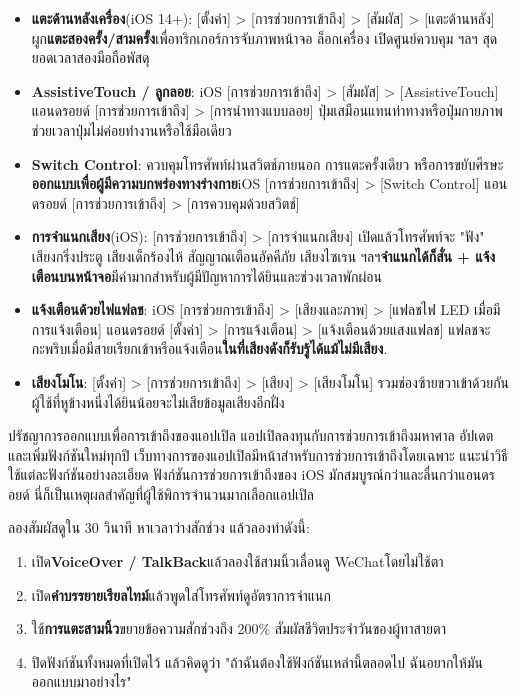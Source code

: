 \begin{itemize}
  \item \textbf{แตะด้านหลังเครื่อง}(iOS 14+): [ตั้งค่า] > [การช่วยการเข้าถึง] > [สัมผัส] > [แตะด้านหลัง] ผูก\textbf{แตะสองครั้ง/สามครั้ง}เพื่อทริกเกอร์การจับภาพหน้าจอ ล็อกเครื่อง เปิดศูนย์ควบคุม ฯลฯ สุดยอดเวลาสองมือถือพัสดุ
  \item \textbf{AssistiveTouch / ลูกลอย}: iOS [การช่วยการเข้าถึง] > [สัมผัส] > [AssistiveTouch] แอนดรอยด์ [การช่วยการเข้าถึง] > [การนำทางแบบลอย] ปุ่มเสมือนแทนท่าทางหรือปุ่มกายภาพ ช่วยเวลาปุ่มไม่ค่อยทำงานหรือใช้มือเดียว
  \item \textbf{Switch Control}: ควบคุมโทรศัพท์ผ่านสวิตช์ภายนอก การแตะครั้งเดียว หรือการขยับศีรษะ\textbf{ออกแบบเพื่อผู้มีความบกพร่องทางร่างกาย}iOS [การช่วยการเข้าถึง] > [Switch Control] แอนดรอยด์ [การช่วยการเข้าถึง] > [การควบคุมด้วยสวิตช์]
  \item \textbf{การจำแนกเสียง}(iOS): [การช่วยการเข้าถึง] > [การจำแนกเสียง] เปิดแล้วโทรศัพท์จะ "ฟัง" เสียงกริ่งประตู เสียงเด็กร้องไห้ สัญญาณเตือนอัคคีภัย เสียงไซเรน ฯลฯ\textbf{จำแนกได้ก็สั่น + แจ้งเตือนบนหน้าจอ}มีค่ามากสำหรับผู้มีปัญหาการได้ยินและช่วงเวลาพักผ่อน
  \item \textbf{แจ้งเตือนด้วยไฟแฟลช}: iOS [การช่วยการเข้าถึง] > [เสียงและภาพ] > [แฟลชไฟ LED เมื่อมีการแจ้งเตือน] แอนดรอยด์ [ตั้งค่า] > [การแจ้งเตือน] > [แจ้งเตือนด้วยแสงแฟลช] แฟลชจะกะพริบเมื่อมีสายเรียกเข้าหรือแจ้งเตือน\textbf{ในที่เสียงดังก็รับรู้ได้แม้ไม่มีเสียง}.
  \item \textbf{เสียงโมโน}: [ตั้งค่า] > [การช่วยการเข้าถึง] > [เสียง] > [เสียงโมโน] รวมช่องซ้ายขวาเข้าด้วยกัน ผู้ใช้ที่หูข้างหนึ่งได้ยินน้อยจะไม่เสียข้อมูลเสียงอีกฝั่ง
\end{itemize}

\begin{tcbinfo}{ปรัชญาการออกแบบเพื่อการเข้าถึงของแอปเปิล}
แอปเปิลลงทุนกับการช่วยการเข้าถึงมหาศาล อัปเดตและเพิ่มฟังก์ชันใหม่ทุกปี เว็บทางการของแอปเปิลมีหน้าสำหรับการช่วยการเข้าถึงโดยเฉพาะ แนะนำวิธีใช้แต่ละฟังก์ชันอย่างละเอียด ฟังก์ชันการช่วยการเข้าถึงของ iOS มักสมบูรณ์กว่าและลื่นกว่าแอนดรอยด์ นี่ก็เป็นเหตุผลสำคัญที่ผู้ใช้พิการจำนวนมากเลือกแอปเปิล

\end{tcbinfo}

\begin{tcbpractice}{ลองสัมผัสดูใน 30 วินาที}
หาเวลาว่างสักช่วง แล้วลองทำดังนี้:

\begin{enumerate}
  \item เปิด\textbf{VoiceOver / TalkBack}แล้วลองใช้สามนิ้วเลื่อนดู WeChatโดยไม่ใช้ตา
  \item เปิด\textbf{คำบรรยายเรียลไทม์}แล้วพูดใส่โทรศัพท์ดูอัตราการจำแนก
  \item ใช้\textbf{การแตะสามนิ้ว}ขยายข้อความสักช่วงถึง 200\% สัมผัสชีวิตประจำวันของผู้ทาสายตา
  \item ปิดฟังก์ชันทั้งหมดที่เปิดไว้ แล้วคิดดูว่า "ถ้าฉันต้องใช้ฟังก์ชันเหล่านี้ตลอดไป ฉันอยากให้มันออกแบบมาอย่างไร"
\end{enumerate}

\end{tcbpractice}
